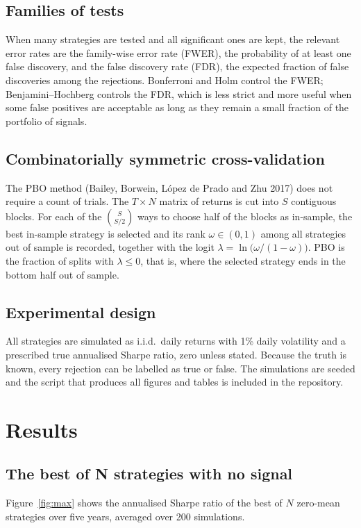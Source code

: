 \documentclass[11pt,a4paper,oneside]{report}
\begin{document}
\section{Families of tests}
When many strategies are tested and all significant ones are kept, the relevant error rates are the family-wise error rate (FWER), the probability of at least one false discovery, and the false discovery rate (FDR), the expected fraction of false discoveries among the rejections. Bonferroni and Holm control the FWER; Benjamini--Hochberg controls the FDR, which is less strict and more useful when some false positives are acceptable as long as they remain a small fraction of the portfolio of signals.

\section{Combinatorially symmetric cross-validation}
The PBO method (Bailey, Borwein, López de Prado and Zhu 2017) does not require a count of trials. The $T\times N$ matrix of returns is cut into $S$ contiguous blocks. For each of the $\binom{S}{S/2}$ ways to choose half of the blocks as in-sample, the best in-sample strategy is selected and its rank $\omega\in(0,1)$ among all strategies out of sample is recorded, together with the logit $\lambda=\ln\big(\omega/(1-\omega)\big)$. PBO is the fraction of splits with $\lambda\le0$, that is, where the selected strategy ends in the bottom half out of sample.

\section{Experimental design}
All strategies are simulated as i.i.d.\ daily returns with 1\% daily volatility and a prescribed true annualised Sharpe ratio, zero unless stated. Because the truth is known, every rejection can be labelled as true or false. The simulations are seeded and the script that produces all figures and tables is included in the repository.

\chapter{Results}

\section{The best of N strategies with no signal}
Figure~\ref{fig:max} shows the annualised Sharpe ratio of the best of $N$ zero-mean strategies over five years, averaged over 200 simulations.
\end{document}
